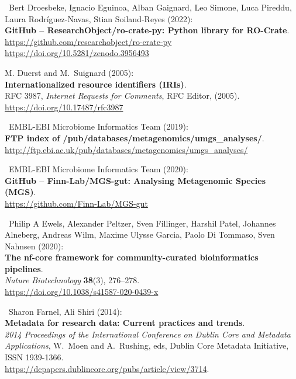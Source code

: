 \begin{thebibliography}{9}
~Bert Droesbeke, Ignacio Eguinoa, Alban Gaignard, Leo Simone,
Luca Pireddu, Laura Rodríguez-Navas, Stian Soiland-Reyes (2022):\\
\textbf{GitHub -- ResearchObject/ro-crate-py: Python library for
RO-Crate}.\\
\url{https://github.com/researchobject/ro-crate-py}~\\
\url{https://doi.org/10.5281/zenodo.3956493}

 M. Duerst and M.~Suignard (2005):\\
\textbf{Internationalized resource identifiers (IRIs)}.\\
RFC 3987, \emph{Internet Requests for Comments}, RFC Editor, (2005).\\
\url{https://doi.org/10.17487/rfc3987}

~EMBL-EBI Microbiome Informatics Team (2019):\\
\textbf{FTP index of /pub/databases/metagenomics/umgs\_analyses/}.\\
\url{http://ftp.ebi.ac.uk/pub/databases/metagenomics/umgs_analyses/}

~EMBL-EBI Microbiome Informatics Team (2020):\\
\textbf{GitHub -- Finn-Lab/MGS-gut: Analysing Metagenomic Species
(MGS)}.\\
\url{https://github.com/Finn-Lab/MGS-gut}

~Philip A Ewels, Alexander Peltzer, Sven Fillinger, Harshil
Patel, Johannes Alneberg, Andreas Wilm, Maxime Ulysse Garcia, Paolo Di
Tommaso, Sven Nahnsen (2020):\\
\textbf{The nf-core framework for community-curated bioinformatics
pipelines}.\\
\emph{Nature Biotechnology} \textbf{38}(3), 276--278.\\
\url{https://doi.org/10.1038/s41587-020-0439-x}

~Sharon Farnel, Ali Shiri (2014):\\
\textbf{Metadata for research data: Current practices and trends}.\\
\emph{2014 Proceedings of the International Conference on Dublin Core
and Metadata Applications}, W.~Moen and A.~Rushing, eds, Dublin Core
Metadata Initiative, ISSN 1939-1366.\\
\url{https://dcpapers.dublincore.org/pubs/article/view/3714}.


\end{thebibliography}
